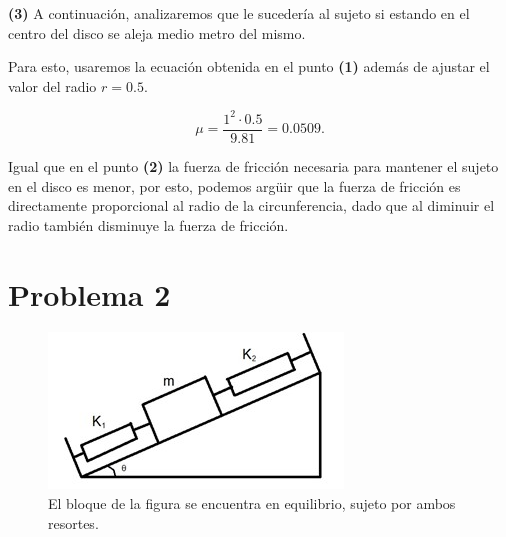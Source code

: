 \documentclass[a4paper,12pt]{article} %
\begin{document}
\vspace{\baselineskip}

\begin{justify}
    \textbf{(3)} A continuación, analizaremos que le sucedería al sujeto si estando en el centro del disco se aleja medio metro del mismo.
\end{justify}

\begin{justify}
    Para esto, usaremos la ecuación obtenida en el punto \textbf{(1)} además de ajustar el valor del radio \(r = 0.5.\)
\end{justify}

\begin{center}
    \[
    \boxed{\mu = \frac{1^2 \cdot 0.5}{9.81} = 0.0509.}
    \]
\end{center}

\begin{justify}
    Igual que en el punto \textbf{(2)} la fuerza de fricción necesaria para mantener el sujeto en el disco es menor, por esto, podemos argüir que la fuerza de fricción es directamente proporcional al radio de la circunferencia, dado que al diminuir el radio también disminuye la fuerza de fricción.  
\end{justify}

\newpage 

\section*{Problema 2} %

\begin{figure}[h!]
    \centering
    \includegraphics[width=\textwidth]{Imagen actividad G.jpg}
    \caption{El bloque de la figura se encuentra en equilibrio, sujeto por ambos resortes. }
\end{figure}
\end{document}
